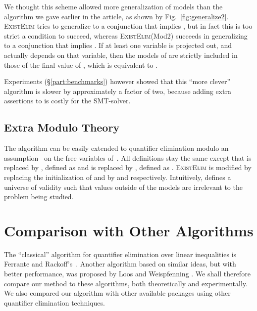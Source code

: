 We thought this scheme allowed more generalization of models than the algorithm we gave earlier in the article, as shown by Fig.~\ref{fig:generalize2}. \textsc{ExistElim} tries to generalize  to a conjunction that implies , but in fact this is too strict a condition to succeed, whereas \textsc{ExistElim}(Mod2) succeeds in generalizing  to a conjunction that implies . If at least one variable is projected out, and  actually depends on that variable, then the models of  are strictly included in those of the final value of , which is equivalent to .

Experiments (\S\ref{part:benchmarks}) however showed that this ``more clever'' algorithm is slower by approximately a factor of two, because adding extra assertions to  is costly for the SMT-solver.

\subsection{Extra Modulo Theory}
The algorithm can be easily extended to quantifier elimination modulo an assumption~ on the free variables of~. All definitions stay the same except that  is replaced by , defined as  and  is replaced by , defined as . \textsc{ExistElim} is modified by replacing the initialization of  and  by  and  respectively. Intuitively,  defines a universe of validity such that values outside of the models  are irrelevant to the problem being studied.

\section{Comparison with Other Algorithms}
The ``classical'' algorithm for quantifier elimination over linear inequalities is Ferrante and Rackoff's~\cite{FerranteRackoff75}. Another algorithm based on similar ideas, but with better performance, was proposed by Loos and Weispfenning \cite{LoosWeispfenning93}.
We shall therefore compare our method to these algorithms, both theoretically and experimentally. We also compared our algorithm with other available packages using other quantifier elimination techniques.


